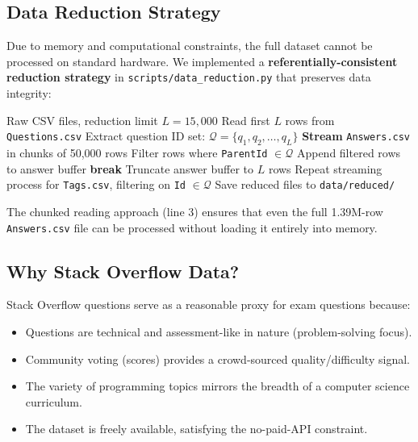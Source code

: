 \documentclass[12pt, a4paper]{article}
\begin{document}
\subsection{Data Reduction Strategy}
\label{sec:data-reduction}

Due to memory and computational constraints, the full dataset cannot be processed on standard hardware. We implemented a \textbf{referentially-consistent reduction strategy} in \texttt{scripts/data\_reduction.py} that preserves data integrity:

\begin{algorithm}[H]
\caption{Referentially-Consistent Data Reduction}
\label{alg:reduce}
\begin{algorithmic}[1]
\REQUIRE Raw CSV files, reduction limit $L = 15{,}000$
\STATE Read first $L$ rows from \texttt{Questions.csv}
\STATE Extract question ID set: $\mathcal{Q} = \{q_1, q_2, \ldots, q_L\}$
\STATE \textbf{Stream} \texttt{Answers.csv} in chunks of 50{,}000 rows
    \STATE Filter rows where \texttt{ParentId} $\in \mathcal{Q}$
    \STATE Append filtered rows to answer buffer
        \STATE \textbf{break}
    \ENDIF
\ENDFOR
\STATE Truncate answer buffer to $L$ rows
\STATE Repeat streaming process for \texttt{Tags.csv}, filtering on \texttt{Id} $\in \mathcal{Q}$
\STATE Save reduced files to \texttt{data/reduced/}
\end{algorithmic}
\end{algorithm}

The chunked reading approach (line 3) ensures that even the full 1.39M-row \texttt{Answers.csv} file can be processed without loading it entirely into memory.

\subsection{Why Stack Overflow Data?}

Stack Overflow questions serve as a reasonable proxy for exam questions because:
\begin{itemize}[noitemsep]
    \item Questions are technical and assessment-like in nature (problem-solving focus).
    \item Community voting (scores) provides a crowd-sourced quality/difficulty signal.
    \item The variety of programming topics mirrors the breadth of a computer science curriculum.
    \item The dataset is freely available, satisfying the no-paid-API constraint.
\end{itemize}
\end{document}
